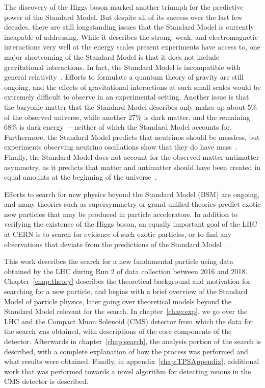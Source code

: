 The discovery of the Higgs boson marked another triumph for the predictive power of the Standard Model.
But despite all of its success over the last few decades, there are still longstanding issues that the Standard Model is currently incapable of addressing.
While it describes the strong, weak, and electromagnetic interactions very well at the energy scales present experiments have access to, one major shortcoming of the Standard Model is that it does not include gravitational interactions.
In fact, the Standard Model is incompatible with general relativity~\cite{Macias200899}.
Efforts to formulate a quantum theory of gravity are still ongoing, and the effects of gravitational interactions at such small scales would be extremely difficult to observe in an experimental setting.
Another issue is that the baryonic matter that the Standard Model describes only makes up about 5\% of the observed universe, while another 27\% is dark matter, and the remaining 68\% is dark energy~\cite{Planck2013}---neither of which the Standard Model accounts for.
Furthermore, the Standard Model predicts that neutrinos should be massless, but experiments observing neutrino oscillations show that they do have mass~\cite{Ahmad_2001}.
Finally, the Standard Model does not account for the observed matter-antimatter asymmetry, as it predicts that matter and antimatter should have been created in equal amounts at the beginning of the universe~\cite{astroParticle}.

Efforts to search for new physics beyond the Standard Model (BSM) are ongoing, and many theories such as supersymmetry or grand unified theories predict exotic new particles that may be produced in particle accelerators.
In addition to verifying the existence of the Higgs boson, an equally important goal of the LHC at CERN is to search for evidence of such exotic particles, or to find any observations that deviate from the predictions of the Standard Model~\cite{doi:10.1080/0010751031000077378,Kanti}.

This work describes the search for a new fundamental particle using data obtained by the LHC during Run 2 of data collection between 2016 and 2018.
Chapter~\ref{chap:theory} describes the theoretical background and motivation for searching for a new particle, and begins with a brief overview of the Standard Model of particle physics, later going over theoretical models beyond the Standard Model relevant for the search.
In chapter~\ref{chap:exp}, we go over the LHC and the Compact Muon Solenoid (CMS) detector from which the data for the search was obtained, with descriptions of the core components of the detector.
Afterwards in chapter~\ref{chap:search}, the analysis portion of the search is described, with a complete explanation of how the process was performed and what results were obtained.
Finally, in appendix~\ref{chap:TPSAppendix}, additional work that was performed towards a novel algorithm for detecting muons in the CMS detector is described.
